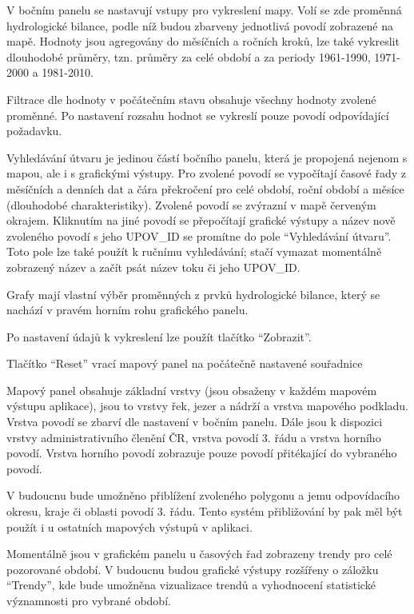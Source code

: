 \documentclass[12pt,]{article}
\begin{document}
V bočním panelu se nastavují vstupy pro vykreslení mapy. Volí se zde
proměnná hydrologické bilance, podle níž budou zbarveny jednotlivá
povodí zobrazené na mapě. Hodnoty jsou agregovány do měsíčních a ročních
kroků, lze také vykreslit dlouhodobé průměry, tzn. průměry za celé
období a za periody 1961-1990, 1971-2000 a 1981-2010.

Filtrace dle hodnoty v počátečním stavu obsahuje všechny hodnoty zvolené
proměnné. Po nastavení rozsahu hodnot se vykreslí pouze povodí
odpovídající požadavku.

Vyhledávání útvaru je jedinou částí bočního panelu, která je propojená
nejenom s mapou, ale i s grafickými výstupy. Pro zvolené povodí se
vypočítají časové řady z měsíčních a denních dat a čára překročení pro
celé období, roční období a měsíce (dlouhodobé charakteristiky). Zvolené
povodí se zvýrazní v mapě červeným okrajem. Kliknutím na jiné povodí se
přepočítají grafické výstupy a název nově zvoleného povodí s jeho
UPOV\_ID se promítne do pole \enquote{Vyhledávání útvaru}. Toto pole lze
také použít k ručnímu vyhledávání; stačí vymazat momentálně zobrazený
název a začít psát název toku či jeho UPOV\_ID.

Grafy mají vlastní výběr proměnných z prvků hydrologické bilance, který
se nachází v pravém horním rohu grafického panelu.

Po nastavení údajů k vykreslení lze použít tlačítko \enquote{Zobrazit}.

Tlačítko \enquote{Reset} vrací mapový panel na počátečně nastavené
souřadnice

Mapový panel obsahuje základní vrstvy (jsou obsaženy v každém mapovém
výstupu aplikace), jsou to vrstvy řek, jezer a nádrží a vrstva mapového
podkladu. Vrstva povodí se zbarví dle nastavení v bočním panelu. Dále
jsou k dispozici vrstvy administrativního členění ČR, vrstva povodí 3.
řádu a vrstva horního povodí. Vrstva horního povodí zobrazuje pouze
povodí přitékající do vybraného povodí.

V budoucnu bude umožněno přiblížení zvoleného polygonu a jemu
odpovídacího okresu, kraje či oblasti povodí 3. řádu. Tento systém
přibližování by pak měl být použít i u ostatních mapových výstupů v
aplikaci.

Momentálně jsou v grafickém panelu u časových řad zobrazeny trendy pro
celé pozorované období. V budoucnu budou grafické výstupy rozšířeny o
záložku \enquote{Trendy}, kde bude umožněna vizualizace trendů a
vyhodnocení statistické významnosti pro vybrané období.
\end{document}
